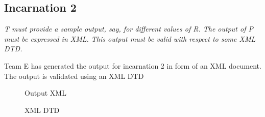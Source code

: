   \subsection{Incarnation 2}
  \begin{flushleft}
    \textit{T must provide a sample output, say, for different values of R. The output of P must be expressed in XML. This output must be valid with respect to some XML DTD.}
  \end{flushleft}
  \begin{flushleft}
    Team E has generated the output for incarnation 2 in form of an XML document. The output is validated using an XML DTD
  \end{flushleft}
  \begin{figure}[h!]
    \centering
    \caption{Output XML}
    \label{fig:XML output}
  \end{figure}
  \begin{figure}[h!]
    \centering
    \caption{XML DTD}
    \label{fig:XML DTD}
  \end{figure}
 